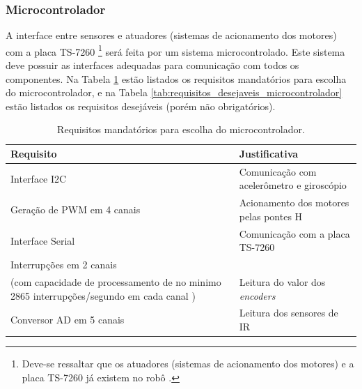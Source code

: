\subsubsection{Microcontrolador}

A interface entre sensores e atuadores (sistemas de acionamento dos motores) com a placa TS-7260 \footnote{Deve-se ressaltar que os atuadores (sistemas de acionamento dos motores) e a placa TS-7260 já existem no robô \cite{bellator_2012}.} será feita por um sistema microcontrolado. Este sistema deve possuir as interfaces adequadas para comunicação com todos os componentes. Na Tabela \ref{tab:requisitos_microcontrolador} estão listados os requisitos mandatórios para escolha do microcontrolador, e na Tabela \ref{tab:requisitos_desejaveis_microcontrolador} estão listados os requisitos desejáveis (porém não obrigatórios).

\begin{table}[h]
  \caption{Requisitos mandatórios para escolha do microcontrolador.}
  \centering
  \begin{tabular}{p{7cm}|p{8cm}}
    \toprule
    \textbf{Requisito} & \textbf{Justificativa} \\
    \hline
    Interface I2C & Comunicação com acelerômetro e giroscópio \\
    \hline
    Geração de PWM em 4 canais & Acionamento dos motores pelas pontes H \\
    \hline
    Interface Serial	 & Comunicação com a placa TS-7260 \\
    \hline
    Interrupções em 2 canais	 \\ (com capacidade de processamento de no minimo 2865 interrupções/segundo em cada canal \footnotemark ) & Leitura do valor dos \textit{encoders} \\
    \hline
    Conversor AD em 5 canais	 & Leitura dos sensores de IR \\
    \bottomrule
  \end{tabular}
  \label{tab:requisitos_microcontrolador}
\end{table}


